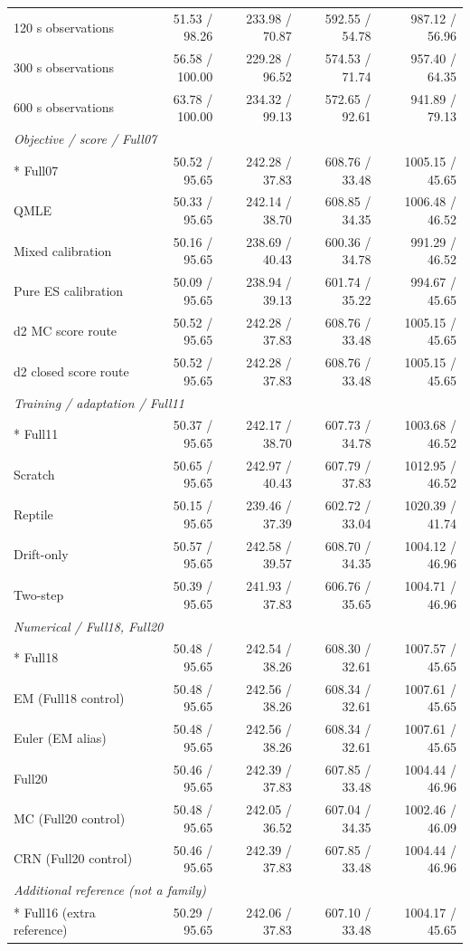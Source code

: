 \begin{longtable}{@{}p{.25\linewidth}rrrr@{}}
120 s observations & 51.53 / 98.26 & 233.98 / 70.87 & 592.55 / 54.78 & 987.12 / 56.96\\
300 s observations & 56.58 / 100.00 & 229.28 / 96.52 & 574.53 / 71.74 & 957.40 / 64.35\\
600 s observations & 63.78 / 100.00 & 234.32 / 99.13 & 572.65 / 92.61 & 941.89 / 79.13\\
\multicolumn{5}{l}{\textit{Objective / score / Full07}}\\*
Full07 & 50.52 / 95.65 & 242.28 / 37.83 & 608.76 / 33.48 & 1005.15 / 45.65\\
QMLE & 50.33 / 95.65 & 242.14 / 38.70 & 608.85 / 34.35 & 1006.48 / 46.52\\
Mixed calibration & 50.16 / 95.65 & 238.69 / 40.43 & 600.36 / 34.78 & 991.29 / 46.52\\
Pure ES calibration & 50.09 / 95.65 & 238.94 / 39.13 & 601.74 / 35.22 & 994.67 / 45.65\\
d2 MC score route & 50.52 / 95.65 & 242.28 / 37.83 & 608.76 / 33.48 & 1005.15 / 45.65\\
d2 closed score route & 50.52 / 95.65 & 242.28 / 37.83 & 608.76 / 33.48 & 1005.15 / 45.65\\
\multicolumn{5}{l}{\textit{Training / adaptation / Full11}}\\*
Full11 & 50.37 / 95.65 & 242.17 / 38.70 & 607.73 / 34.78 & 1003.68 / 46.52\\
Scratch & 50.65 / 95.65 & 242.97 / 40.43 & 607.79 / 37.83 & 1012.95 / 46.52\\
Reptile & 50.15 / 95.65 & 239.46 / 37.39 & 602.72 / 33.04 & 1020.39 / 41.74\\
Drift-only & 50.57 / 95.65 & 242.58 / 39.57 & 608.70 / 34.35 & 1004.12 / 46.96\\
Two-step & 50.39 / 95.65 & 241.93 / 37.83 & 606.76 / 35.65 & 1004.71 / 46.96\\
\multicolumn{5}{l}{\textit{Numerical / Full18, Full20}}\\*
Full18 & 50.48 / 95.65 & 242.54 / 38.26 & 608.30 / 32.61 & 1007.57 / 45.65\\
EM (Full18 control) & 50.48 / 95.65 & 242.56 / 38.26 & 608.34 / 32.61 & 1007.61 / 45.65\\
Euler (EM alias) & 50.48 / 95.65 & 242.56 / 38.26 & 608.34 / 32.61 & 1007.61 / 45.65\\
Full20 & 50.46 / 95.65 & 242.39 / 37.83 & 607.85 / 33.48 & 1004.44 / 46.96\\
MC (Full20 control) & 50.48 / 95.65 & 242.05 / 36.52 & 607.04 / 34.35 & 1002.46 / 46.09\\
CRN (Full20 control) & 50.46 / 95.65 & 242.39 / 37.83 & 607.85 / 33.48 & 1004.44 / 46.96\\
\multicolumn{5}{l}{\textit{Additional reference (not a family)}}\\*
Full16 (extra reference) & 50.29 / 95.65 & 242.06 / 37.83 & 607.10 / 33.48 & 1004.17 / 45.65\\
\end{longtable}
\endgroup
